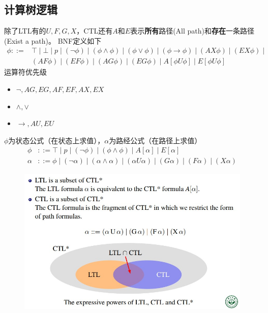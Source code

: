 \subsection{计算树逻辑}
\begin{definition}
除了LTL有的$U,F,G,X$，CTL还有$A$和$E$表示\textbf{所有}路径(All path)和\textbf{存在}一条路径(Exist a path)。
BNF定义如下
\[\begin{aligned}
\phi::=&\top\mid\bot\mid p\mid
(\lnot\phi)\mid
(\phi\land\phi)\mid
(\phi\lor\phi)\mid
(\phi\to\phi)\mid
(AX\phi)\mid
(EX\phi)\mid\\
&(AF\phi)\mid
(EF\phi)\mid
(AG\phi)\mid
(EG\phi)\mid
A[\phi U\phi]\mid
E[\phi U\phi]
\end{aligned}\]
运算符优先级
\begin{itemize}
	\item $\lnot,AG,EG,AF,EF,AX,EX$
	\item $\land,\lor$
	\item $\to,AU,EU$
\end{itemize}
\end{definition}
\begin{definition}[CTL*]
$\phi$为状态公式（在状态上求值），$\alpha$为路经公式（在路径上求值）
\[\begin{aligned}
\phi&::=
\top\mid
p\mid
(\lnot\phi)\mid
(\phi\land\phi)\mid
A[\alpha]\mid
E[\alpha]\\
\alpha&::=\phi\mid
(\lnot\alpha)\mid
(\alpha\land\alpha)\mid
(\alpha U\alpha)\mid
(G\alpha)\mid
(F\alpha)\mid
(X\alpha)
\end{aligned}\]
\end{definition}
\begin{figure}[H]
\centering
\includegraphics[width=0.8\linewidth]{fig/ltl_ctl.jpg}
\end{figure}